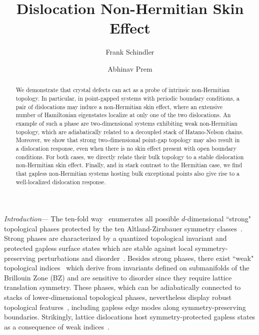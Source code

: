 \documentclass[aps,prl,twocolumn,amsmath,amssymb,floatfix,superscriptaddress]{revtex4-2}
\begin{document}
\title{Dislocation Non-Hermitian Skin Effect}

\author{Frank Schindler}

\author{Abhinav Prem}

\begin{abstract}
We demonstrate that crystal defects can act as a probe of intrinsic non-Hermitian topology. In particular, in point-gapped systems with periodic boundary conditions, a pair of dislocations may induce a non-Hermitian skin effect, where an extensive number of Hamiltonian eigenstates localize at only one of the two dislocations. An example of such a phase are two-dimensional systems exhibiting weak non-Hermitian topology, which are adiabatically related to a decoupled stack of Hatano-Nelson chains. Moreover, we show that strong two-dimensional point-gap topology may also result in a dislocation response, even when there is no skin effect present with open boundary conditions. For both cases, we directly relate their bulk topology to a stable dislocation non-Hermitian skin effect. Finally, and in stark contrast to the Hermitian case, we find that gapless non-Hermitian systems hosting bulk exceptional points also give rise to a well-localized dislocation response.
\end{abstract}

\maketitle

\emph{Introduction}--- 
The ten-fold way~\cite{Kitaev_2009,Ryu_2010,Chiu:2016aa} enumerates all possible $d$-dimensional ``strong" topological phases protected by the ten Altland-Zirnbauer symmetry classes~\cite{AZclass}. Strong phases are characterized by a quantized topological invariant and protected gapless surface states which are stable against local symmetry-preserving perturbations and disorder~\cite{HasanKaneColloq,qizhangrmp,hasanmoorerev}. Besides strong phases, there exist ``weak" topological indices~\cite{Kane07,Roy2009,Moore07,noguchi2019} which derive from invariants defined on submanifolds of the Brillouin Zone (BZ) and are sensitive to disorder since they require lattice translation symmetry. These phases, which can be adiabatically connected to stacks of lower-dimensional topological phases, nevertheless display robust topological features~\cite{Mong2012,AdyWeak,morimoto2014}, including gapless edge modes along symmetry-preserving boundaries. Strikingly, lattice dislocations host symmetry-protected gapless states as a consequence of weak indices~\cite{AshvinScrewTI,TeoKaneDefect,ran2010weak,OurDefectPaper}.
\end{document}
